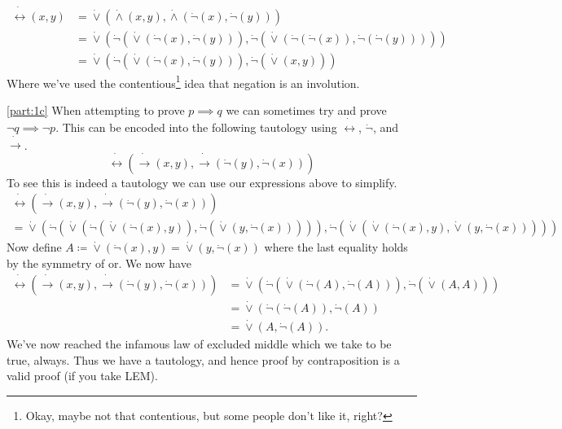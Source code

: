 \documentclass[boxes,pages,color=CornflowerBlue]{homework}
\begin{document}
\begin{solution}
    \begin{align*}
        \dot{\leftrightarrow}(x, y) & = \dot{\vee}(\dot{\wedge}(x, y), \dot{\wedge}(\dot{\neg}(x), \dot{\neg}(y)))                                                                     \\
                                    & = \dot{\vee}(\dot{\neg}(\dot{\vee}(\dot{\neg}(x), \dot{\neg}(y))), \dot{\neg}(\dot{\vee}(\dot{\neg}(\dot{\neg}(x)), \dot{\neg}(\dot{\neg}(y))))) \\
                                    & = \dot{\vee}(\dot{\neg}(\dot{\vee}(\dot{\neg}(x), \dot{\neg}(y))), \dot{\neg}(\dot{\vee}(x, y)))
    \end{align*}
    Where we've used the contentious\footnote{Okay, maybe not that contentious, but some people don't like it, right?} idea that negation is an involution.

    \ref{part:1c}
    When attempting to prove $p \implies q$ we can sometimes try and prove $\neg q \implies \neg p$.
    This can be encoded into the following tautology using $\dot{\leftrightarrow}$, $\dot{\neg}$, and $\dot{\rightarrow}$.
    \begin{equation*}
        \dot{\leftrightarrow}(\dot{\rightarrow}(x, y), \dot{\rightarrow}(\dot{\neg}(y), \dot{\neg}(x)))
    \end{equation*}
    To see this is indeed a tautology we can use our expressions above to simplify.
    \begin{multline*}
        \dot{\leftrightarrow}(\dot{\rightarrow}(x, y), \dot{\rightarrow}(\dot{\neg}(y), \dot{\neg}(x))) \\
        = \dot{\vee}(\dot{\neg}(\dot{\vee}(\dot{\neg}(\dot{\vee}(\dot{\neg}(x), y)), \dot{\neg}(\dot{\vee}(y, \dot{\neg}(x))))), \dot{\neg}(\dot{\vee}(\dot{\vee}(\dot{\neg}(x), y), \dot{\vee}(y, \dot{\neg}(x)))))
    \end{multline*}
    Now define $A \coloneqq \dot{\vee}(\dot{\neg}(x), y) = \dot{\vee}(y, \dot{\neg}(x))$ where the last equality holds by the symmetry of or.
    We now have
    \begin{align*}
        \dot{\leftrightarrow}(\dot{\rightarrow}(x, y), \dot{\rightarrow}(\dot{\neg}(y), \dot{\neg}(x))) & = \dot{\vee}(\dot{\neg}(\dot{\vee}(\dot{\neg}(A), \dot{\neg}(A))), \dot{\neg}(\dot{\vee}(A, A))) \\
                                                                                                        & = \dot{\vee}(\dot{\neg}(\dot{\neg}(A)), \dot{\neg}(A))                                           \\
                                                                                                        & = \dot{\vee}(A, \dot{\neg}(A)).
    \end{align*}
    We've now reached the infamous law of excluded middle which we take to be true, always.
    Thus we have a tautology, and hence proof by contraposition is a valid proof (if you take LEM).
\end{solution}
\end{document}
